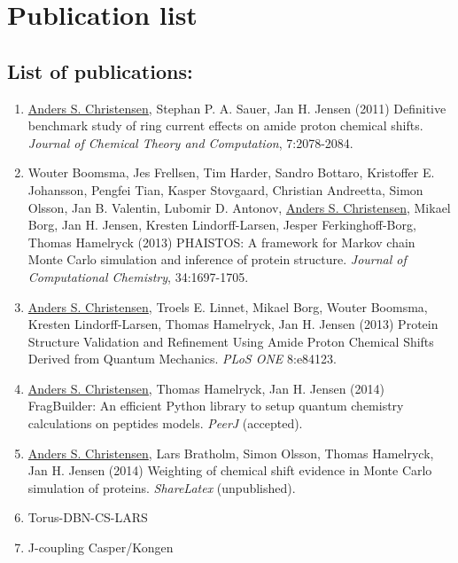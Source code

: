 \chapter*{Publication list}

\section*{List of publications:}
\begin{enumerate}
    \item \underline{Anders S. Christensen}, Stephan P. A. Sauer, Jan H. Jensen (2011) Definitive benchmark study of ring current effects on amide proton chemical shifts. \textit{Journal of Chemical Theory and Computation}, 7:2078-2084.
    \item Wouter Boomsma, Jes Frellsen, Tim Harder, Sandro Bottaro, Kristoffer E. Johansson, Pengfei Tian, Kasper Stovgaard, Christian Andreetta, Simon Olsson, Jan B. Valentin, Lubomir D. Antonov, \underline{Anders S. Christensen}, Mikael Borg, Jan H. Jensen, Kresten Lindorff-Larsen, Jesper Ferkinghoff-Borg, Thomas Hamelryck (2013) PHAISTOS: A framework for Markov chain Monte Carlo simulation and inference of protein structure. \textit{Journal of Computational Chemistry}, 34:1697-1705.
    \item  \underline{Anders S. Christensen}, Troels E. Linnet, Mikael Borg, Wouter Boomsma, Kresten Lindorff-Larsen, Thomas Hamelryck, Jan H. Jensen (2013)  Protein Structure Validation and Refinement Using Amide Proton Chemical Shifts Derived from Quantum Mechanics. \textit{PLoS ONE} 8:e84123.
    \item \underline{Anders S. Christensen}, Thomas Hamelryck, Jan H. Jensen (2014) FragBuilder: An efficient Python library to setup quantum chemistry calculations on peptides models. \textit{PeerJ} (accepted).
    \item \underline{Anders S. Christensen}, Lars Bratholm, Simon Olsson, Thomas Hamelryck, Jan H. Jensen (2014) Weighting of chemical shift evidence in Monte Carlo simulation of proteins. \textit{ShareLatex} (unpublished).
    \item Torus-DBN-CS-LARS
    \item J-coupling Casper/Kongen
\end{enumerate}
